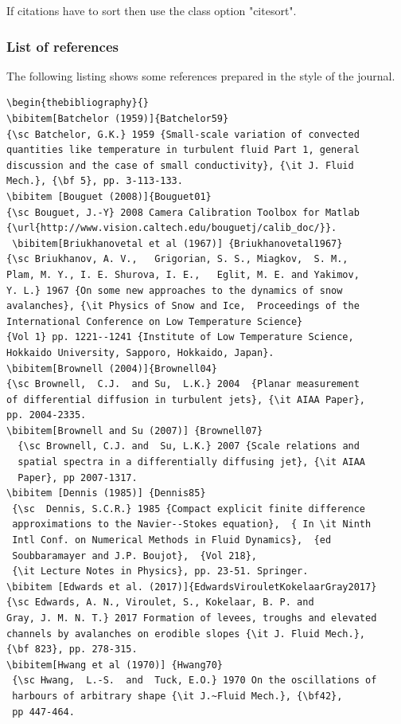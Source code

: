 \documentclass[lineno]{JFM-FLM_Au}
\begin{document}
If citations have to sort then use the class option "citesort".

\subsubsection{List of references}\label{fullref}

The following listing shows some references prepared in the style of the
journal.
%
\begin{verbatim}
\begin{thebibliography}{}
\bibitem[Batchelor (1959)]{Batchelor59}
{\sc Batchelor, G.K.} 1959 {Small-scale variation of convected
quantities like temperature in turbulent fluid Part 1, general
discussion and the case of small conductivity}, {\it J. Fluid
Mech.}, {\bf 5}, pp. 3-113-133.
\bibitem [Bouguet (2008)]{Bouguet01}
{\sc Bouguet, J.-Y} 2008 Camera Calibration Toolbox for Matlab
{\url{http://www.vision.caltech.edu/bouguetj/calib_doc/}}.
 \bibitem[Briukhanovetal et al (1967)] {Briukhanovetal1967}
{\sc Briukhanov, A. V.,   Grigorian, S. S., Miagkov,  S. M.,
Plam, M. Y., I. E. Shurova, I. E.,   Eglit, M. E. and Yakimov,
Y. L.} 1967 {On some new approaches to the dynamics of snow
avalanches}, {\it Physics of Snow and Ice,  Proceedings of the
International Conference on Low Temperature Science}
{Vol 1} pp. 1221--1241 {Institute of Low Temperature Science,
Hokkaido University, Sapporo, Hokkaido, Japan}.
\bibitem[Brownell (2004)]{Brownell04}
{\sc Brownell,  C.J.  and Su,  L.K.} 2004  {Planar measurement
of differential diffusion in turbulent jets}, {\it AIAA Paper},
pp. 2004-2335.
\bibitem[Brownell and Su (2007)] {Brownell07}
  {\sc Brownell, C.J. and  Su, L.K.} 2007 {Scale relations and
  spatial spectra in a differentially diffusing jet}, {\it AIAA
  Paper}, pp 2007-1317.
\bibitem [Dennis (1985)] {Dennis85}
 {\sc  Dennis, S.C.R.} 1985 {Compact explicit finite difference
 approximations to the Navier--Stokes equation},  { In \it Ninth
 Intl Conf. on Numerical Methods in Fluid Dynamics},  {ed
 Soubbaramayer and J.P. Boujot},  {Vol 218},
 {\it Lecture Notes in Physics}, pp. 23-51. Springer.
\bibitem [Edwards et al. (2017)]{EdwardsVirouletKokelaarGray2017}
{\sc Edwards, A. N., Viroulet, S., Kokelaar, B. P. and
Gray, J. M. N. T.} 2017 Formation of levees, troughs and elevated
channels by avalanches on erodible slopes {\it J. Fluid Mech.},
{\bf 823}, pp. 278-315.
\bibitem[Hwang et al (1970)] {Hwang70}
 {\sc Hwang,  L.-S.  and  Tuck, E.O.} 1970 On the oscillations of
 harbours of arbitrary shape {\it J.~Fluid Mech.}, {\bf42},
 pp 447-464.

\end{verbatim}
\end{document}
